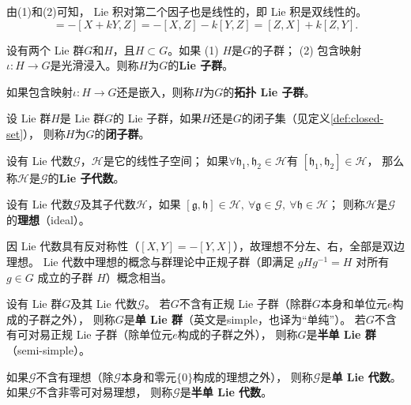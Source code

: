 由(1)和(2)可知， Lie 积对第二个因子也是线性的，即 Lie 积是双线性的。
\begin{equation*}
    [Z,  X + k Y]= -[ X + k Y, Z]= -[X, Z]- k[Y, Z] = [Z,X]+ k[Z, Y].
\end{equation*}

\begin{definition}
    设有两个 Lie 群$G$和$H$，且$H\subset G$。如果 (1) $H$是$G$的子群；
    (2) 包含映射$\iota:H\to G$是光滑浸入。则称$H$为$G$的\textbf{Lie 子群}。

    如果包含映射$\iota:H\to G$还是嵌入，则称$H$为$G$的\textbf{拓扑 Lie 子群}。
\end{definition}

\begin{definition}
    设 Lie 群$H$是 Lie 群$G$的 Lie 子群，如果$H$还是$G$的闭子集（见定义\ref{def:closed-set}），
    则称$H$为$G$的\textbf{闭子群}。
\end{definition}

\begin{definition}
    设有 Lie 代数$\mathscr{G}$，$\mathscr{H}$是它的线性子空间；
    如果$\forall \mathfrak{h}_1,\mathfrak{h}_2\in \mathscr{H}$有
    $[\mathfrak{h}_1,\mathfrak{h}_2]\in \mathscr{H}$，
    那么称$\mathscr{H}$是$\mathscr{G}$的\textbf{Lie 子代数}。
\end{definition}

\begin{definition}
    设有 Lie 代数$\mathscr{G}$及其子代数$\mathscr{H}$，如果
    $   [\mathfrak{g},\mathfrak{h}]\in  \mathscr{H},\
    \forall \mathfrak{g}\in \mathscr{G}, \ \forall\mathfrak{h}\in\mathscr{H}$；
    则称$\mathscr{H}$是$\mathscr{G}$的\textbf{理想}（ideal）。
\end{definition}
因 Lie 代数具有反对称性（$[X,Y]=-[Y,X]$），故理想不分左、右，全部是双边理想。
 Lie 代数中理想的概念与群理论中正规子群（即满足 $gHg^{-1}=H$ 对所有 $g\in G$ 成立的子群 $H$）概念相当。

\begin{definition}
    设有 Lie 群$G$及其 Lie 代数$\mathscr{G}$。
    若$G$不含有正规 Lie 子群（除群$G$本身和单位元$e$构成的子群之外），
    则称$G$是\textbf{单 Lie 群}（英文是simple，也译为“单纯”）。
    若$G$不含有{可对易}正规 Lie 子群（除单位元$e$构成的子群之外），
    则称$G$是\textbf{半单 Lie 群}（semi-simple）。
\end{definition}

\begin{definition}
    如果$\mathscr{G}$不含有理想（除$\mathscr{G}$本身和零元$\{0\}$构成的理想之外），
    则称$\mathscr{G}$是\textbf{单 Lie 代数}。
    如果$\mathscr{G}$不含非零可对易理想，
    则称$\mathscr{G}$是\textbf{半单 Lie 代数}。
\end{definition}

